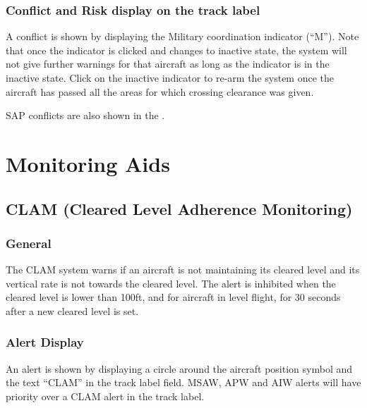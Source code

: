 \documentclass[a4paper,oneside,11pt]{memoir}
\begin{document}
\subsubsection*{Conflict and Risk display on the track label}

A conflict is shown by displaying the Military coordination indicator (“M”). Note that once the indicator is clicked and changes to inactive state, the system will not give further warnings for that aircraft as long as the indicator is in the inactive state. Click on the inactive indicator to re-arm the system once the aircraft has passed all the areas for which crossing clearance was given.

\bigskip

SAP conflicts are also shown in the .

\section{Monitoring Aids}



\subsection{CLAM (Cleared Level Adherence Monitoring)}
\label{tool:CLAM}
\subsubsection*{General}

The CLAM system warns if an aircraft is not maintaining its cleared level and its vertical rate is not towards the cleared level. The alert is inhibited when the cleared level is lower than 100ft, and for aircraft in level flight, for 30 seconds after a new cleared level is set.

\subsubsection*{Alert Display}

An alert is shown by displaying a circle around the aircraft position symbol and the text “CLAM” in the  track label field. MSAW, APW and AIW alerts will have priority over a CLAM alert in the track label.
\end{document}
